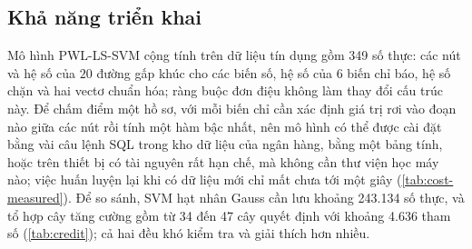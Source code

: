 \subsection{Khả năng triển khai}

Mô hình PWL-LS-SVM cộng tính trên dữ liệu tín dụng gồm 349 số thực: các nút và hệ số của $20$ đường gấp khúc cho các biến số, hệ số của $6$ biến chỉ báo, hệ số chặn và hai vectơ chuẩn hóa; ràng buộc đơn điệu không làm thay đổi cấu trúc này. Để chấm điểm một hồ sơ, với mỗi biến chỉ cần xác định giá trị rơi vào đoạn nào giữa các nút rồi tính một hàm bậc nhất, nên mô hình có thể được cài đặt bằng vài câu lệnh SQL trong kho dữ liệu của ngân hàng, bằng một bảng tính, hoặc trên thiết bị có tài nguyên rất hạn chế, mà không cần thư viện học máy nào; việc huấn luyện lại khi có dữ liệu mới chỉ mất chưa tới một giây (\cref{tab:cost-measured}). Để so sánh, SVM hạt nhân Gauss cần lưu khoảng 243.134 số thực, và tổ hợp cây tăng cường gồm từ 34 đến 47 cây quyết định với khoảng 4.636 tham số (\cref{tab:credit}); cả hai đều khó kiểm tra và giải thích hơn nhiều.
